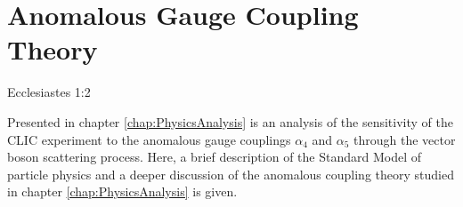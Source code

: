 \chapter{Anomalous Gauge Coupling Theory}
\label{chap:anomalousgaugecouplingtheory}

{Ecclesiastes 1:2}

Presented in chapter \ref{chap:PhysicsAnalysis} is an analysis of the sensitivity of the CLIC experiment to the anomalous gauge couplings $\alpha_{4}$ and $\alpha_{5}$ through the vector boson scattering process.  Here, a brief description of the Standard Model of particle physics and a deeper discussion of the anomalous coupling theory studied in chapter \ref{chap:PhysicsAnalysis} is given.  

%
